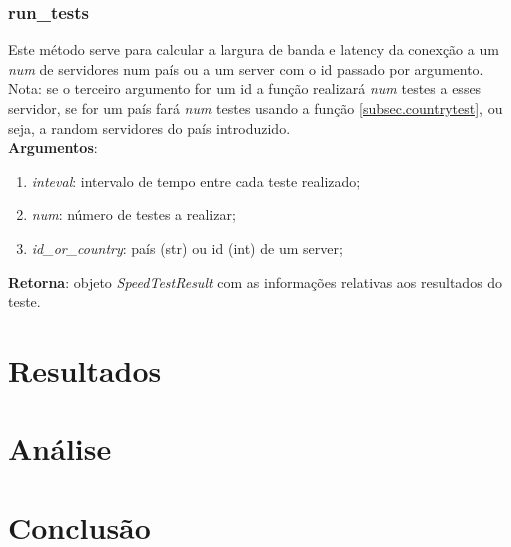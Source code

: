 \documentclass{report}
\begin{document}
\subsection{run\_tests}
\hspace{5mm}Este método serve para calcular a largura de banda e latency da conexção a um \textit{num} de servidores num país ou a um server com o id passado por argumento.\\
Nota: se o terceiro argumento for um id a função realizará \textit{num} testes a esses servidor, se for um país fará \textit{num} testes usando a função \autoref{subsec.countrytest}, ou seja, a random servidores do país introduzido.\\
\hspace{5mm}\textbf{Argumentos}: 
\begin{enumerate}
\item \textit{inteval}: intervalo de tempo entre cada teste realizado;
\item \textit{num}: número de testes a realizar;
\item \textit{id\_or\_country}: país (str) ou id (int) de um server;
\end{enumerate}
\textbf{Retorna}: objeto \textit{SpeedTestResult} com as informações relativas aos resultados do teste.

\chapter{Resultados}
\label{chap:resultados}
\chapter{Análise}
\label{chap:analise}
\chapter{Conclusão}
\label{chap:conclusao}



\end{document}
